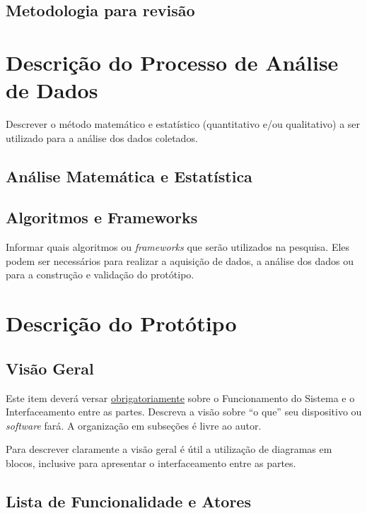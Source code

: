 \subsection{Metodologia para revisão}

\section{Descrição do Processo de Análise de Dados}
\label{sec:analise}

Descrever o método matemático e estatístico (quantitativo e/ou qualitativo) a ser utilizado para a análise dos dados coletados.

\subsection{Análise Matemática e Estatística}

\subsection{Algoritmos e Frameworks}

Informar quais algoritmos ou \textit{frameworks} que serão utilizados na pesquisa. Eles podem ser necessários para realizar a aquisição de dados, a análise dos dados ou para a construção e validação do protótipo.

\section{Descrição do Protótipo}
\label{sec:prototipo}

\subsection{Visão Geral}

Este item deverá versar \underline{obrigatoriamente} sobre o Funcionamento do Sistema e o Interfaceamento entre as partes. Descreva a visão sobre “o que” seu dispositivo ou \textit{software} fará. A organização em subseções é livre ao autor.

Para descrever claramente a visão geral é útil a utilização de diagramas em blocos, inclusive para apresentar o interfaceamento entre as partes. 

\subsection{Lista de Funcionalidade e Atores}

